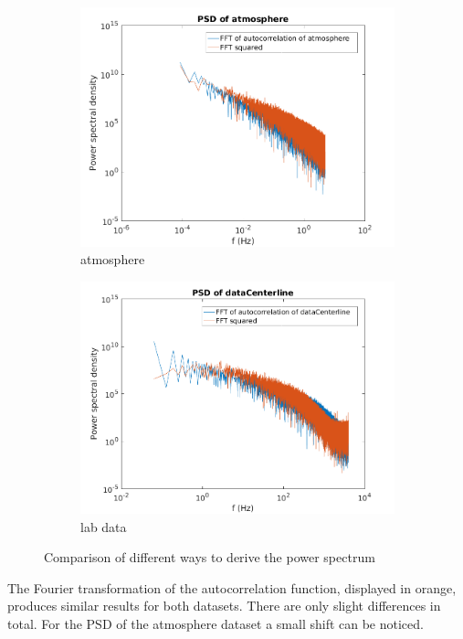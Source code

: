 \documentclass[12pt]{article}
\begin{document}
\begin{figure}[H]
\begin{subfigure}{0.5\textwidth}
  \centering
  \includegraphics[width=1\linewidth]{figures/atmo_numerically_equal.png}
  \caption{atmosphere}
\end{subfigure}
\begin{subfigure}{0.5\textwidth}
  \centering
  \includegraphics[width=1\linewidth]{figures/center_numerically_equal.png}
  \caption{lab data}
\end{subfigure}
\caption{Comparison of different ways to derive the power spectrum}
\label{fig:comparison_power}
\end{figure}

The Fourier transformation of the autocorrelation function, displayed in orange, produces similar results for both datasets. There are only slight differences in total. For the PSD of the atmosphere dataset a small shift can be noticed.
\end{document}
